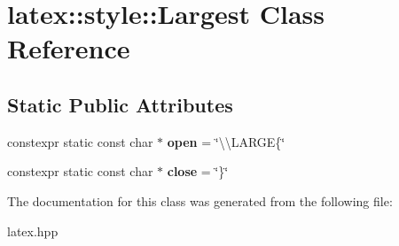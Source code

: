 \hypertarget{classlatex_1_1style_1_1Largest}{\section{latex\-:\-:style\-:\-:Largest Class Reference}
\label{classlatex_1_1style_1_1Largest}
}
\subsection*{Static Public Attributes}
\begin{DoxyCompactItemize}
\item 
\hypertarget{classlatex_1_1style_1_1Largest_adbb0b19eadf9f950f410b654d6f8ba05}{constexpr static const char $\ast$ {\bfseries open} = \char`\"{}\textbackslash{}\textbackslash{}L\-A\-R\-G\-E\{\char`\"{}}\label{classlatex_1_1style_1_1Largest_adbb0b19eadf9f950f410b654d6f8ba05}

\item 
\hypertarget{classlatex_1_1style_1_1Largest_a678cae6a7d34ed7d6e7f87bd966a81fd}{constexpr static const char $\ast$ {\bfseries close} = \char`\"{}\}\char`\"{}}\label{classlatex_1_1style_1_1Largest_a678cae6a7d34ed7d6e7f87bd966a81fd}

\end{DoxyCompactItemize}


The documentation for this class was generated from the following file\-:\begin{DoxyCompactItemize}
\item 
latex.\-hpp\end{DoxyCompactItemize}

